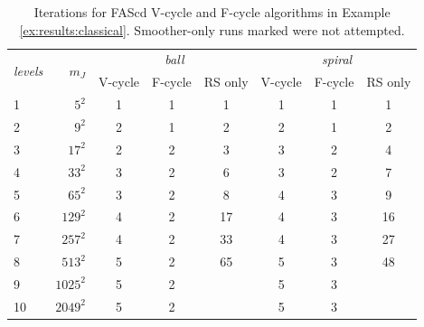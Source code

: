 \documentclass[letterpaper,final,12pt,reqno]{amsart}
\theoremstyle{cstyle}
\theoremstyle{cstyle*}
\theoremstyle{dstyle}
\numberwithin{equation}{section}
\numberwithin{figure}{section}
\numberwithin{table}{section}
\numberwithin{theorem}{section}
\newcommand{\XX}{\ding{55}}
\begin{document}
\begin{table}[ht]
\begin{tabular}{lr@{\hskip 7mm}cccccc}
\multirow{2}{*}{\emph{levels}} & \multirow{2}{*}{$m_J$} & \multicolumn{3}{c}{\,\emph{ball}} & \multicolumn{3}{c}{\,\emph{spiral}} \\ \cmidrule(lr){3-5} \cmidrule(lr){6-8}
   &          & V-cycle & F-cycle & RS only & V-cycle & F-cycle & RS only \\ \cmidrule{1-8}
 1 &    $5^2$ &  1 &  1 &  1  &  1 &  1 &  1 \\
 2 &    $9^2$ &  2 &  1 &  2  &  2 &  1 &  2 \\
 3 &   $17^2$ &  2 &  2 &  3  &  3 &  2 &  4 \\
 4 &   $33^2$ &  3 &  2 &  6  &  3 &  2 &  7 \\
 5 &   $65^2$ &  3 &  2 &  8  &  4 &  3 &  9 \\
 6 &  $129^2$ &  4 &  2 & 17  &  4 &  3 & 16 \\
 7 &  $257^2$ &  4 &  2 & 33  &  4 &  3 & 27 \\
 8 &  $513^2$ &  5 &  2 & 65  &  5 &  3 & 48 \\
 9 & $1025^2$ &  5 &  2 & \XX &  5 &  3 & \XX \\
10 & $2049^2$ &  5 &  2 & \XX &  5 &  3 & \XX
\end{tabular}
\bigskip
\caption{Iterations for FAScd V-cycle and F-cycle algorithms in Example \ref{ex:results:classical}.  Smoother-only runs marked \XX\xspace were not attempted.}
\label{tab:results:classical}
\end{table}
\end{document}
